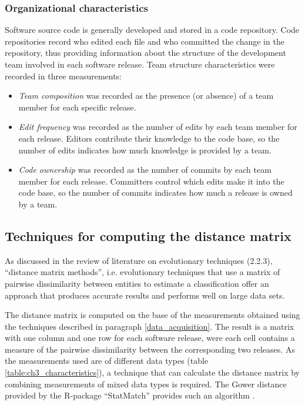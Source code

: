 \subsubsection{Organizational characteristics}
Software source code is generally developed and stored in a code repository. Code repositories record who edited each file and who committed the change in the repository, thus providing information about the structure of the development team involved in each software release. Team structure characteristics were recorded in three measurements:

\begin{itemize}
\item{\textit{Team composition} was recorded as the presence (or absence) of a team member for each specific release.}
  
\item{\textit{Edit frequency} was recorded as the number of edits by each team member for each release. Editors contribute their knowledge to the code base, so the number of edits indicates how much knowledge is provided by a team.}

\item{\textit{Code ownership} was recorded as the number of commits by each team member for each release. Committers control which edits make it into the code base, so the number of commits indicates how much a release is owned by a team.}
\end{itemize}



\subsection{Techniques for computing the distance matrix}
\label{computing_distance_matrix}

As discussed in the review of literature on evolutionary techniques (2.2.3), “distance matrix methods”, i.e. evolutionary techniques that use a matrix of pairwise dissimilarity between entities to estimate a classification \citep{FelsensteinJ.andFelenstein2004a} offer an approach that produces accurate results and performs well on large data sets.

The distance matrix is computed on the base of the measurements obtained using the techniques described in paragraph \ref{data_acquisition}. The result is a matrix with one column and one row for each software release, were each cell contains a measure of the pairwise dissimilarity between the corresponding two releases. As the measurements used are of different data types (table \ref{table:ch3_characteristics}), a technique that can calculate the distance matrix by combining measurements of mixed data types is required. The Gower distance provided by the R-package “StatMatch” provides such an algorithm \citep{DOrazio2016}.

